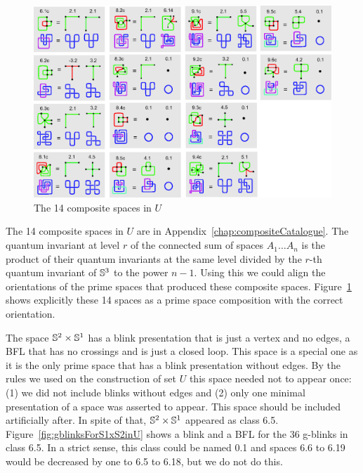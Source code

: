 \begin{figure}[h!tp]
   \begin{center}
      \leavevmode
      \includegraphics[width=16cm]{A.figs/compositespaces.eps}
   \end{center}
   \vspace{-0.7cm}
   \caption{ The 14 composite spaces in $U$}
   \label{fig:compositeSpaces}
\end{figure}

The 14 composite spaces in $U$ are in Appendix~\ref{chap:compositeCatalogue}.
The quantum invariant at level $r$ of the connected sum of spaces $A_1 \ldots A_n$ is the product
of their quantum invariants at the same level divided by the $r$-th quantum invariant of $\mathbb{S}^3$ to
the power $n-1$. Using this we could align the orientations of the prime spaces that
produced these composite spaces. Figure~\ref{fig:compositeSpaces} shows explicitly these
14 spaces as a prime space composition with the correct orientation.

The space $\mathbb{S}^2 \times \mathbb{S}^1$ has a blink presentation that is just a vertex
and no edges, \ie a BFL that has no crossings and is just a closed loop. This
space is a special one as it is the only prime space that has a blink presentation
without edges. By the rules we used on the construction of set $U$ this space
needed not to appear once: (1) we did not include blinks without edges and
(2) only one minimal presentation of a space was asserted to appear. This
space should be included artificially after. In spite of that, $\mathbb{S}^2 \times \mathbb{S}^1$
appeared as class 6.5. Figure~\ref{fig:gblinksForS1xS2inU} shows a blink
and a BFL for the 36 g-blinks in class 6.5. In a strict sense, this class
could be named 0.1 and spaces 6.6 to 6.19 would be decreased by one to 6.5
to 6.18, but we do not do this.

